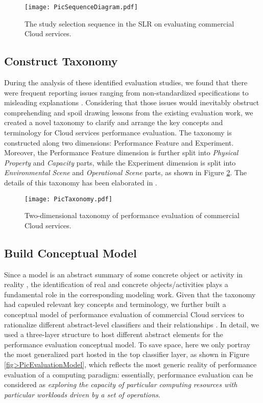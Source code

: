 \documentclass[10pt, conference, compsocconf]{IEEEtran}
\begin{document}
\begin{figure}[!t]
\centering
\texttt{[image: PicSequenceDiagram.pdf]}
\caption{The study selection sequence in the SLR on evaluating commercial Cloud services.}
\label{fig>PicSequenceDiagram}
\end{figure}

\subsection{Construct Taxonomy}
During the analysis of these identified evaluation studies, we found that there were frequent reporting issues ranging from non-standardized specifications to misleading explanations \cite{Li_OBrien_2012a}. Considering that those issues would inevitably obstruct comprehending and spoil drawing lessons from the existing evaluation work, we created a novel taxonomy to clarify and arrange the key concepts and terminology for Cloud services performance evaluation. The taxonomy is constructed along two dimensions: Performance Feature and Experiment. Moreover, the Performance Feature dimension is further split into \textit{Physical Property} and \textit{Capacity} parts, while the Experiment dimension is split into \textit{Environmental Scene} and \textit{Operational Scene} parts, as shown in Figure \ref{fig>PicTaxonomy}. The details of this taxonomy has been elaborated in \cite{Li_OBrien_2012a}.

\begin{figure}[!t]
\centering
\texttt{[image: PicTaxonomy.pdf]}
\caption{Two-dimensional taxonomy of performance evaluation of commercial Cloud services.}
\label{fig>PicTaxonomy}
\end{figure}

\subsection{Build Conceptual Model}
\label{II>model}
Since a model is an abstract summary of some concrete object or activity in reality \cite{Mellor_Clark_2003}, the identification of real and concrete objects/activities plays a fundamental role in the corresponding modeling work. Given that the taxonomy had capsuled relevant key concepts and terminology, we further built a conceptual model of performance evaluation of commercial Cloud services to rationalize different abstract-level classifiers and their relationships \cite{Li_OBrien_2012c}. In detail, we used a three-layer structure to host different abstract elements for the performance evaluation conceptual model. To save space, here we only portray the most generalized part hosted in the top classifier layer, as shown in Figure \ref{fig>PicEvaluationModel}, which reflects the most generic reality of performance evaluation of a computing paradigm: essentially, performance evaluation can be considered as \emph{exploring the capacity of particular computing resources with particular workloads driven by a set of operations}.
\end{document}
